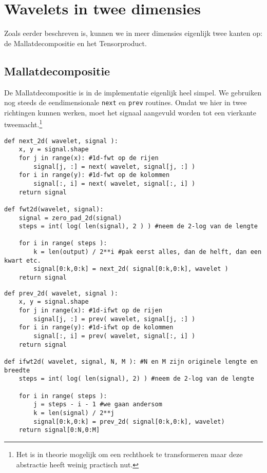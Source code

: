 \section{Wavelets in twee dimensies}
Zoals eerder beschreven is, kunnen we in meer dimensies eigenlijk twee kanten op: de Mallatdecompositie en het Tensorproduct.

\subsection{Mallatdecompositie}
De Mallatdecompositie is in de implementatie eigenlijk heel simpel. We gebruiken nog steeds de eendimensionale \texttt{next} en \texttt{prev} routines. Omdat we hier in twee richtingen kunnen werken, moet het signaal aangevuld worden tot een vierkante tweemacht.\footnote{Het is in theorie mogelijk om een rechthoek te transformeren maar deze abstractie heeft weinig practisch nut.}

\begin{lstlisting}[caption=De Mallatdecompositie in 2 dimensies]
def next_2d( wavelet, signal ):
	x, y = signal.shape
	for j in range(x): #1d-fwt op de rijen
		signal[j, :] = next( wavelet, signal[j, :] )
	for i in range(y): #1d-fwt op de kolommen
		signal[:, i] = next( wavelet, signal[:, i] )
	return signal

def fwt2d(wavelet, signal):
	signal = zero_pad_2d(signal)
	steps = int( log( len(signal), 2 ) ) #neem de 2-log van de lengte
	
	for i in range( steps ):
		k = len(output) / 2**i #pak eerst alles, dan de helft, dan een kwart etc.
		signal[0:k,0:k] = next_2d( signal[0:k,0:k], wavelet )
	return signal
\end{lstlisting}
\begin{lstlisting}[caption=De omgekeerde Mallatdecompositie in 2 dimensies]
def prev_2d( wavelet, signal ):
	x, y = signal.shape
	for j in range(x): #1d-ifwt op de rijen
		signal[j, :] = prev( wavelet, signal[j, :] )
	for i in range(y): #1d-ifwt op de kolommen
		signal[:, i] = prev( wavelet, signal[:, i] )
	return signal

def ifwt2d( wavelet, signal, N, M ): #N en M zijn originele lengte en breedte
	steps = int( log( len(signal), 2) ) #neem de 2-log van de lengte
	
	for i in range( steps ):
		j = steps - i - 1 #we gaan andersom
		k = len(signal) / 2**j
		signal[0:k,0:k] = prev_2d( signal[0:k,0:k], wavelet)
	return signal[0:N,0:M]
\end{lstlisting}

